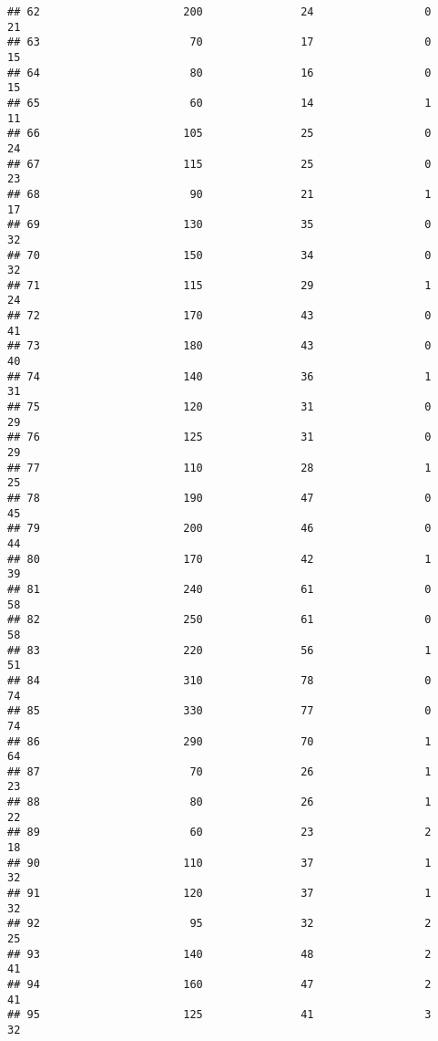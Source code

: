 \documentclass[
]{article}
\begin{document}
\begin{verbatim}
## 62                      200               24                 0         21
## 63                       70               17                 0         15
## 64                       80               16                 0         15
## 65                       60               14                 1         11
## 66                      105               25                 0         24
## 67                      115               25                 0         23
## 68                       90               21                 1         17
## 69                      130               35                 0         32
## 70                      150               34                 0         32
## 71                      115               29                 1         24
## 72                      170               43                 0         41
## 73                      180               43                 0         40
## 74                      140               36                 1         31
## 75                      120               31                 0         29
## 76                      125               31                 0         29
## 77                      110               28                 1         25
## 78                      190               47                 0         45
## 79                      200               46                 0         44
## 80                      170               42                 1         39
## 81                      240               61                 0         58
## 82                      250               61                 0         58
## 83                      220               56                 1         51
## 84                      310               78                 0         74
## 85                      330               77                 0         74
## 86                      290               70                 1         64
## 87                       70               26                 1         23
## 88                       80               26                 1         22
## 89                       60               23                 2         18
## 90                      110               37                 1         32
## 91                      120               37                 1         32
## 92                       95               32                 2         25
## 93                      140               48                 2         41
## 94                      160               47                 2         41
## 95                      125               41                 3         32

\end{verbatim}
\end{document}
